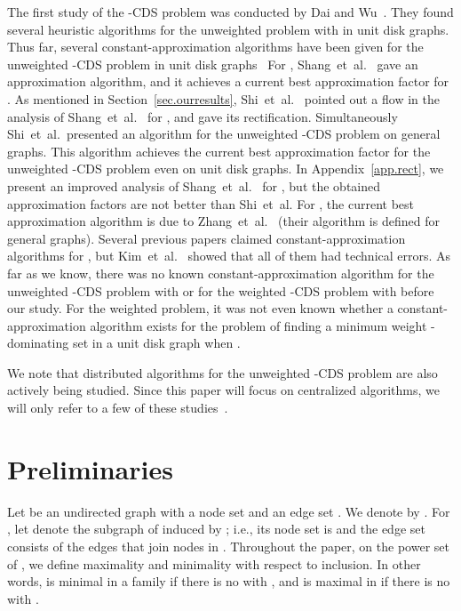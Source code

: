 \documentclass[11pt]{article}
\begin{document}
The first study of the -CDS problem
was conducted by Dai and Wu~\cite{Dai:2006}.
They found several heuristic algorithms for the unweighted problem with
 in unit disk graphs.
Thus far, several constant-approximation algorithms have been given for the
unweighted -CDS problem in unit disk graphs~\cite{Shang:2007jg,WangTD09,WangKAGLZW13,Wang:2015}
For , Shang~et~al.\ \cite{Shang:2007jg} gave an 
approximation algorithm,
and it achieves a current best approximation factor for .
As mentioned in Section~\ref{sec.ourresults},
Shi~et~al.~\cite{ShiZZW16}
pointed out a flow in the analysis of
Shang~et~al.\ \cite{Shang:2007jg} for ,
and gave its rectification.
Simultaneously Shi~et~al.\ presented an algorithm for the unweighted -CDS problem on general
graphs. This algorithm achieves the current best approximation factor for
the unweighted -CDS problem even on
unit disk graphs.
In Appendix~\ref{app.rect},
we present an improved analysis of Shang~et~al.~\cite{Shang:2007jg} for
, but the obtained approximation factors are not better than 
Shi~et~al.
For ,
the current best approximation algorithm is 
due to
Zhang~et~al.\ \cite{Zhang16} (their algorithm is defined for general graphs).
Several previous papers
claimed constant-approximation algorithms for , but
Kim~et~al.~\cite{KimWLZW10} showed that
all of them had technical errors.
As far as we know, there was no known constant-approximation algorithm for the
unweighted -CDS problem with  or for
the weighted -CDS problem with  before our study.
For the weighted problem, it was not even known whether a
constant-approximation algorithm exists for the problem of finding a
minimum weight -dominating set in a unit disk graph when .



We note that 
distributed algorithms for
the unweighted -CDS problem are also actively being studied.
Since this paper will focus on centralized algorithms,
we will only refer to a few of these
studies~\cite{Alzoubi02,FunkeKMS06,YuJYLC2015}.


 \section{Preliminaries}
 \label{sec.prelim}

 
 Let  be an undirected graph with a node set  and an edge
 set .
 We denote  by .
 For , let  denote the subgraph of 
 induced by ; i.e., its node set is  and the edge set consists of
 the edges that join nodes in .
 Throughout the paper, on the power set of , we define maximality and minimality
with respect to inclusion.
 In other words,  is minimal in a family 
 if there is no  with ,
 and  is maximal in  if there is no 
 with .
\end{document}

